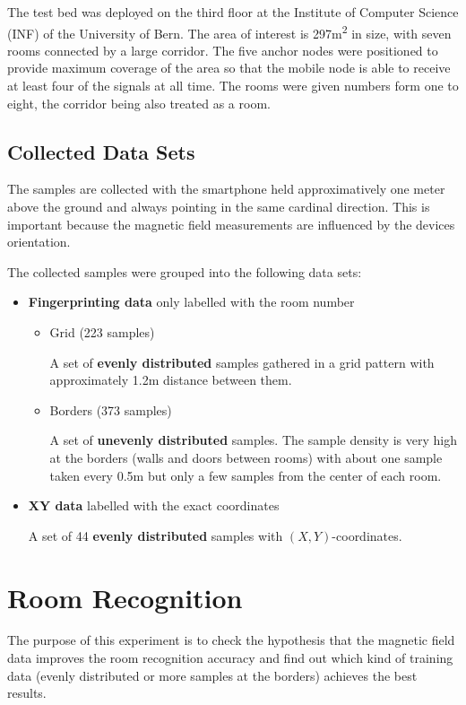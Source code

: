 The test bed was deployed on the third floor at the Institute of Computer Science (INF) of the University of Bern. The area of interest is 297m\textsuperscript{2} in size, with seven rooms connected by a large corridor. The five anchor nodes were positioned to provide maximum coverage of the area so that the mobile node is able to receive at least four of the signals at all time. The rooms were given numbers form one to eight, the corridor being also treated as a room.

\subsection{Collected Data Sets}

The samples are collected with the smartphone held approximatively one meter above the ground and always pointing in the same cardinal direction. This is important because the magnetic field measurements are influenced by the devices orientation.

The collected samples were grouped into the following data sets:

\begin{itemize}
\item \textbf{Fingerprinting data} only labelled with the room number
	\begin{itemize}
	\item Grid (223 samples)

	A set of \textbf{evenly distributed} samples gathered in a grid pattern with approximately 1.2m distance between them.
	\item Borders (373 samples)
	
	A set of \textbf{unevenly distributed} samples. The sample density is very high at the borders (walls and doors between rooms) with about one sample taken every 0.5m but only a few samples from the center of each room.
	\end{itemize}
 \item \textbf{XY data} labelled with the exact coordinates
 
 A set of 44 \textbf{evenly distributed} samples with \((X,Y)\)-coordinates.
\end{itemize}

\section{Room Recognition}
\label{EvaluationRoomRecognition}

The purpose of this experiment is to check the hypothesis that the magnetic field data improves the room recognition accuracy and find out which kind of training data (evenly distributed or more samples at the borders) achieves the best results.

